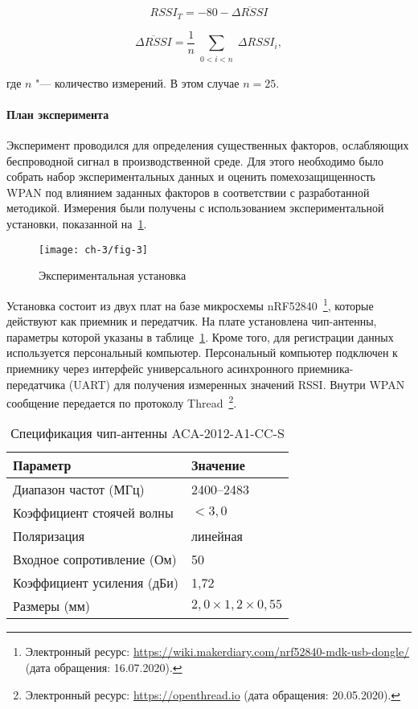 \begin{equation}
	RSSI_T = -80-\overline{{\mathit \Delta} RSSI}
	\label{eq-6}
\end{equation}

\begin{equation}
	\overline{{\mathit \Delta} RSSI} = \frac1n \sum_{\substack{0 < i < n}}{\mathit\Delta} RSSI_i,
	\label{eq-7}
\end{equation}

\noindent где $n$ "--- количество измерений. В этом случае $n = 25$.

\paragraph{План эксперимента}

Эксперимент проводился для определения существенных факторов, ослабляющих беспроводной сигнал в производственной среде. Для этого необходимо было собрать набор экспериментальных данных и оценить помехозащищенность WPAN под влиянием заданных факторов в соответствии с разработанной методикой.
Измерения были получены с использованием экспериментальной установки, показанной на~\cref{ch-3/fig-3}.

\begin{figure} [ht]
	\centering
	\texttt{[image: ch-3/fig-3]}
	\caption{Экспериментальная установка}
	\label{ch-3/fig-3}
\end{figure}

Установка состоит из двух плат на базе микросхемы nRF52840~\footnote{Электронный ресурс: {\tiny\url{https://wiki.makerdiary.com/nrf52840-mdk-usb-dongle/} (дата обращения: 16.07.2020)}.}, которые действуют как приемник и передатчик. На плате установлена чип-антенны, параметры которой указаны в таблице~\cref{tab-1}. Кроме того, для регистрации данных используется персональный компьютер. Персональный компьютер подключен к приемнику через интерфейс универсального асинхронного приемника-передатчика (UART) для получения измеренных значений RSSI. Внутри WPAN сообщение передается по протоколу Thread~\footnote{Электронный ресурс: {\tiny\url{https://openthread.io}} (дата обращения: 20.05.2020).}.

\begin{table}[ht]
\centering
\caption{Спецификация чип-антенны ACA-2012-A1-CC-S} \vspace{4pt}
\label{tab-1}
	\begin{tabularx}{\linewidth}{XX}
		\toprule
		\textbf{Параметр} & \textbf{Значение} \\
		\midrule
		Диапазон частот (МГц) & 2400--2483 \\
		Коэффициент стоячей волны &$<3,0$\\
		Поляризация & линейная \\
		Входное сопротивление (Ом) & 50 \\
		Коэффициент усиления (дБи) & 1,72 \\
		Размеры (мм) & $2,0 \times1,2 \times0,55$\\
		\bottomrule
	\end{tabularx}
\end{table}

